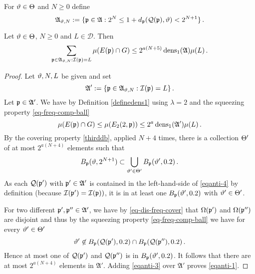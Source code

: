 For ${\vartheta} \in {\Theta}$ and $N\ge 0$ define
\begin{equation}\label{eqantidefap}
    \mathfrak{A}_{{\vartheta},N}:=\{{\mathfrak p}\in\mathfrak{A}: 2^{N}\le 1+d_{{\mathfrak p}}({\mathcal{Q}}({\mathfrak p}), {\vartheta}) < 2^{N+1}\} \, .
\end{equation}


\begin{lemma}
\label{stack-density}
\leanok
{}
Let ${\vartheta} \in {\Theta}$, $N\ge 0$ and
$L\in \mathcal{D}$. Then
\begin{equation}\label{eqanti-1}
    \sum_{{\mathfrak p}\in\mathfrak{A}_{{\vartheta},N}:{\mathcal{I}}({\mathfrak p})=L}\mu(E({\mathfrak p})\cap G)\le 2^{a(N+5)}\operatorname{\operatorname{dens}}_1(\mathfrak{A})\mu(L)\, .
\end{equation}
\end{lemma}
\begin{proof}
\leanok
Let ${\vartheta},N,L$ be given and set
\begin{equation}
\mathfrak{A}':=\{{\mathfrak p}\in\mathfrak{A}_{{\vartheta},N}:{\mathcal{I}}({\mathfrak p})=L\}\, .
\end{equation}
Let
${\mathfrak p}\in\mathfrak{A}'$.
We have
by Definition \eqref{definedens1}
using $\lambda=2$ and the squeezing property \eqref{eq-freq-comp-ball}
\begin{equation}\label{eqanti-3}
\mu(E({\mathfrak p})\cap G)\le \mu(E_2(2, {\mathfrak p}))\le 2^{a}\operatorname{\operatorname{dens}}_1(\mathfrak{A}')\mu(L)\, .
\end{equation}
By the covering property \eqref{thirddb}, applied $N+4$ times, there is a collection ${\Theta}'$ of at most $2^{a(N+4)}$
elements such that
\begin{equation}\label{eqanti-4}
    B_{{\mathfrak p}}({\vartheta}, 2^{N+1})\subset \bigcup_{{\vartheta}'\in {\Theta}'}
    B_{{\mathfrak p}}({\vartheta}', 0.2)\, .
\end{equation}
As each ${\mathcal{Q}}({\mathfrak p}')$ with ${\mathfrak p}'\in \mathfrak{A}'$
is contained in the left-hand-side
of \eqref{eqanti-4}
by definition (because ${\mathcal{I}}({\mathfrak p}') = {\mathcal{I}}({\mathfrak p}))$, it is in at least one $B_{{\mathfrak p}}({\vartheta}', 0.2)$
with ${\vartheta}'\in {\Theta}'$.


For two different ${\mathfrak p}',{\mathfrak p}''\in \mathfrak{A}'$, we have by
\eqref{eq-dis-freq-cover} that
${\Omega}({\mathfrak p}')$ and ${\Omega}({\mathfrak p}'')$ are disjoint and thus by the squeezing property \eqref{eq-freq-comp-ball} we have for every ${\vartheta}'\in {\Theta}'$
\begin{equation}
    {\vartheta}'\not\in B_{{\mathfrak p}}({\mathcal{Q}}({\mathfrak p}'), 0.2)\cap
B_{{\mathfrak p}}({\mathcal{Q}}({\mathfrak p}''), 0.2)\, .
\end{equation}
Hence at most one of ${\mathcal{Q}}({\mathfrak p}')$
and ${\mathcal{Q}}({\mathfrak p}'')$ is in
$B_{{\mathfrak p}}({\vartheta}', 0.2)$.
It follows that there are at most $2^{a(N+4)}$ elements in
$\mathfrak{A}'$. Adding \eqref{eqanti-3} over $\mathfrak{A}'$ proves
\eqref{eqanti-1}.
\end{proof}


